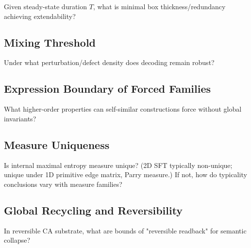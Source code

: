 \documentclass[12pt]{article}
\theoremstyle{plain}
\theoremstyle{definition}
\begin{document}
Given steady-state duration $T$, what is minimal box thickness/redundancy achieving extendability?

\subsection{Mixing Threshold}

Under what perturbation/defect density does decoding remain robust?

\subsection{Expression Boundary of Forced Families}

What higher-order properties can self-similar constructions force without global invariants?

\subsection{Measure Uniqueness}

Is internal maximal entropy measure unique? (2D SFT typically non-unique; unique under 1D primitive edge matrix, Parry measure.) If not, how do typicality conclusions vary with measure families?

\subsection{Global Recycling and Reversibility}

In reversible CA substrate, what are bounds of "reversible readback" for semantic collapse?
\end{document}
